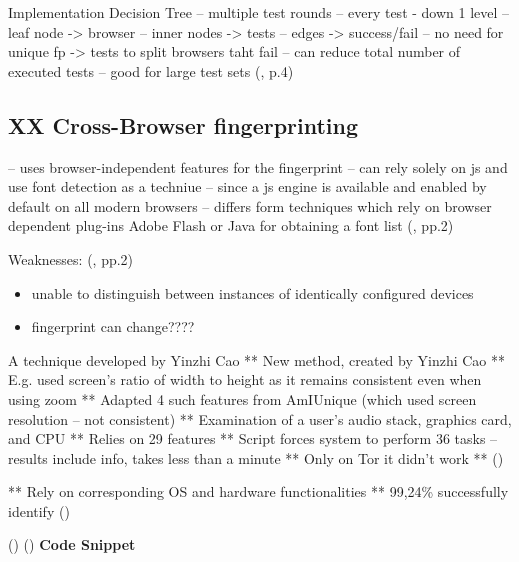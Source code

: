 Implementation Decision Tree
-- multiple test rounds
-- every test - down 1 level
-- leaf node -> browser
-- inner nodes -> tests
-- edges -> success/fail
-- no need for unique fp -> tests to split browsers taht fail
-- can reduce total number of executed tests
-- good for large test sets
(\textcite{mulazzani13}, p.4)

\subsection{XX Cross-Browser fingerprinting}
-- uses browser-independent features for the fingerprint
-- can rely solely on js and use font detection as a techniue
-- since a js engine is available and enabled by default on all modern browsers 
-- differs form techniques which rely on browser dependent plug-ins Adobe Flash or Java for obtaining a font list
(\textcite{upi15}, pp.2)
 
Weaknesses: (\textcite{upi15}, pp.2)
\begin{itemize}
	\item unable to distinguish between instances of identically configured devices
	\item fingerprint can change????
\end{itemize} 
 

A technique developed by Yinzhi Cao
**	New method, created by Yinzhi Cao
**	E.g. used screen’s ratio of width to height as it remains consistent even when using zoom
**	Adapted 4 such features from AmIUnique (which used screen resolution – not consistent)
**	Examination of a user’s audio stack, graphics card, and CPU
**	Relies on 29 features
**	Script forces system to perform 36 tasks – results include info, takes less than a minute
**	Only on Tor it didn’t work
**	(\textcite{nordrum17})

**	Rely on corresponding OS and hardware functionalities
**	99,24\%  successfully identify (\textcite{Cao17})



(\textcite{Cao17})
(\textcite{boda11})
\textbf{Code Snippet}
